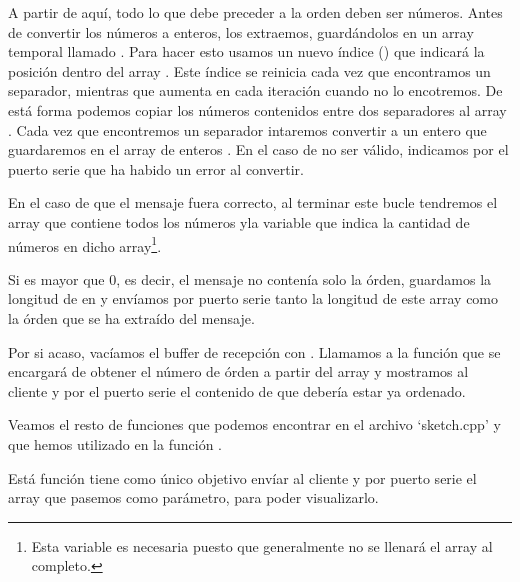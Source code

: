 A partir de aquí, todo lo que debe preceder a la orden deben ser números. Antes de convertir los números a enteros, los extraemos, guardándolos en un array temporal llamado . Para hacer esto usamos un nuevo índice () que indicará la posición dentro del array . Este índice se reinicia cada vez que encontramos un separador, mientras que aumenta en cada iteración cuando no lo encotremos. De está forma podemos copiar los números contenidos entre dos separadores al array . Cada vez que encontremos un separador intaremos convertir  a un entero que guardaremos en el array de enteros . En el caso de no ser válido, indicamos por el puerto serie que ha habido un error al convertir.

En el caso de que el mensaje fuera correcto, al terminar este bucle tendremos el array  que contiene todos los números yla variable  que indica la cantidad de números en dicho array\protect\footnote{Esta variable es necesaria puesto que generalmente no se llenará el array al completo.}. 


Si  es mayor que 0, es decir, el mensaje no contenía solo la órden, guardamos la longitud de  en  y envíamos por puerto serie tanto la longitud de este array como la órden que se ha extraído del mensaje.


Por si acaso, vacíamos el buffer de recepción con . Llamamos a la función  que se encargará de obtener el número de órden a partir del array  y mostramos al cliente y por el puerto serie el contenido de  que debería estar ya ordenado.

Veamos el resto de funciones que podemos encontrar en el archivo `sketch.cpp' y que hemos utilizado en la función .


Está función tiene como único objetivo envíar al cliente y por puerto serie el array que pasemos como parámetro, para poder visualizarlo.

